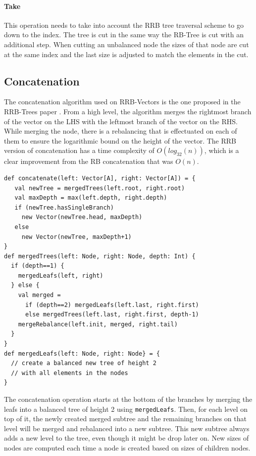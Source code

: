 
\paragraph{Take}
This operation needs to take into account the RRB tree traversal scheme to go down to the index. The tree is cut in the same way the RB-Tree is cut with an additional step. When cutting an unbalanced node the sizes of that node are cut at the same index and the last size is adjusted to match the elements in the cut. 


\subsection{Concatenation}
The concatenation algorithm used on RRB-Vectors is the one proposed in the RRB-Trees paper \cite{RRBTrees}. From a high level, the algorithm merges the rightmost branch of the vector on the LHS with the leftmost branch of the vector on the RHS. While merging the node, there is a rebalancing that is effectuated on each of them to ensure the logarithmic bound on the height of the vector. The RRB version of concatenation has a time complexity of $O(log_{32}(n))$, which is a clear improvement from the RB concatenation that was $O(n)$.
 
%
\begin{lstlisting}[frame=single]
def concatenate(left: Vector[A], right: Vector[A]) = {
   val newTree = mergedTrees(left.root, right.root)
   val maxDepth = max(left.depth, right.depth)
   if (newTree.hasSingleBranch)
     new Vector(newTree.head, maxDepth)
   else 
     new Vector(newTree, maxDepth+1)
}
def mergedTrees(left: Node, right: Node, depth: Int) {
  if (depth==1) {
    mergedLeafs(left, right)
  } else { 
    val merged = 
      if (depth==2) mergedLeafs(left.last, right.first) 
      else mergedTrees(left.last, right.first, depth-1)
    mergeRebalance(left.init, merged, right.tail)
  }
}
def mergedLeafs(left: Node, right: Node} = {
  // create a balanced new tree of height 2 
  // with all elements in the nodes
}
\end{lstlisting}

The concatenation operation starts at the bottom of the branches by merging the leafs into a balanced tree of height 2 using \texttt{mergedLeafs}. Then, for each level on top of it, the newly created merged subtree and the remaining branches on that level will be merged and rebalanced into a new subtree. This new subtree always adds a new level to the tree, even though it might be drop later on. New sizes of nodes are computed each time a node is created based on sizes of children nodes.

